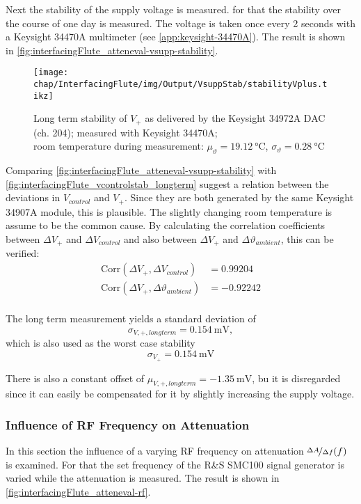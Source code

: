 Next the stability of the supply voltage is measured.
for that the stability over the course of one day is measured. The voltage is taken once every 2 seconds with a Keysight 34470A multimeter (see \autoref{app:keysight-34470A}). The result is shown in \autoref{fig:interfacingFlute_atteneval-vsupp-stability}.

\begin{figure}[tb]
	\centering
	\texttt{[image: chap/InterfacingFlute/img/Output/VsuppStab/stabilityVplus.tikz]}
	\caption{Long term stability of $V_{+}$ as delivered by the Keysight 34972A DAC (ch. 204); measured with Keysight 34470A;\\room temperature during measurement: $\mu_\vartheta=\SI{19.12}{\degreeCelsius}$, $\sigma_\vartheta=\SI{0.28}{\degreeCelsius}$}
	\label{fig:interfacingFlute_atteneval-vsupp-stability}
\end{figure}

Comparing \autoref{fig:interfacingFlute_atteneval-vsupp-stability} with \autoref{fig:interfacingFlute_vcontrolstab_longterm} suggest a relation between the deviations in $V_{control}$ and $V_+$. Since they are both generated by the same Keysight 34907A module, this is plausible. The slightly changing room temperature is assume to be the common cause.
By calculating the correlation coefficients between $\Delta V_+$ and $\Delta V_{control}$ and also between $\Delta V_+$ and $\Delta \vartheta_{ambient}$, this can be verified:
\begin{align}
\text{Corr}(\Delta V_+,\Delta V_{control})         &= \num{0.99204} \\
\text{Corr}(\Delta V_+,\Delta \vartheta_{ambient}) &= \num{-0.92242} \\
\end{align}

The long term measurement yields a standard deviation of
\begin{equation}
\sigma_{V,+,longterm} = \SI{0.154}{\milli\volt},
\end{equation}
which is also used as the worst case stability
\begin{equation}
\sigma_{V_+} = \SI{0.154}{\milli\volt}
\end{equation}

There is also a constant offset of $\mu_{V,+,longterm}=\SI{-1.35}{\milli\volt}$, bu it is disregarded since it can easily be compensated for it by slightly increasing the supply voltage.

\subsubsection{Influence of RF Frequency on Attenuation}
In this section the influence of a varying RF frequency on attenuation $\nicefrac{\Delta A}{\Delta f} (f)$ is examined. For that the set frequency of the R\&S SMC100 signal generator is varied while the attenuation is measured. The result is shown in \autoref{fig:interfacingFlute_atteneval-rf}.


